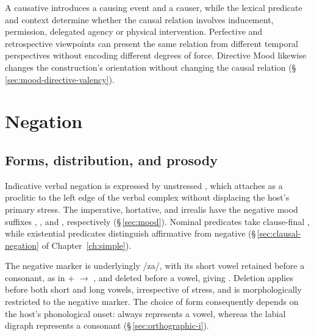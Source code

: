A causative introduces a causing event and a causer, while the lexical predicate
and context determine whether the causal relation involves inducement,
permission, delegated agency or physical intervention. Perfective and
retrospective viewpoints can present the same relation from different temporal
perspectives without encoding different degrees of force. Directive Mood
likewise changes the construction's orientation without changing the causal
relation (§\,\ref{sec:mood-directive-valency}).

\section{Negation}\label{sec:negation}

\subsection{Forms, distribution, and prosody}\label{sec:neg-allomorphy}

Indicative verbal negation is expressed by unstressed , which attaches
as a proclitic to the left edge of the verbal complex without displacing the
host's primary stress. The imperative, hortative, and irrealis have the negative
mood suffixes , , and , respectively
(§\,\ref{sec:mood}). Nominal predicates take clause-final , while
existential predicates distinguish affirmative  from negative
 (§\,\ref{sec:clausal-negation} of Chapter~\ref{ch:simple}).

The negative marker is underlyingly /za/, with its short vowel retained before
a consonant, as in  +  $\rightarrow$
, and deleted before a vowel, giving . Deletion applies before both short and long vowels, irrespective of stress,
and is morphologically restricted to the negative marker. The choice of form consequently depends on the host's
phonological onset:  always represents a vowel, whereas the labial
digraph  represents a consonant (§\,\ref{sec:orthographic-i}).

